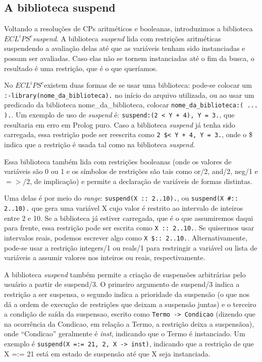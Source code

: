\documentclass{article}
\newcommand{\eclipse}{$ECL^iPS^e$}
\begin{document}
\subsection{A biblioteca suspend}

Voltando a resoluções de CPs aritméticos e booleanas, introduzimos a biblioteca \eclipse \textit{suspend}. A biblioteca \textit{suspend} lida com restrições aritméticas suspendendo a avaliação delas até que as variáveis tenham sido instanciadas e possam ser avaliadas. Caso elas não se tornem instanciadas até o fim da busca, o resultado é uma restrição, que é o que queríamos.

No \eclipse existem duas formas de se usar uma biblioteca: pode-se colocar um {\tt :-library(nome\_da\_biblioteca).} no início do arquivo utilizada, ou ao usar um predicado da biblioteca nome\_da\_biblioteca, colocar {\tt nome\_da\_biblioteca:( ... ).}. Um exemplo de uso de \textit{suspend} é: {\tt suspend:(2 < Y + 4), Y = 3.}, que resultaria em erro em Prolog puro. Caso a biblioteca \textit{suspend} já tenha sido carregada, essa restrição pode ser reescrita como {\tt 2 \$< Y + 4, Y = 3.},
onde o \$ indica que a restrição é usada tal como na biblioteca \textit{suspend}.

Essa biblioteca também lida com restrições booleanas (onde os valores de variáveis são 0 ou 1 e os símbolos de restrições são tais como or/2, and/2, neg/1 e $=>$/2, de implicação) e permite a declaração de variáveis de formas distintas.

Uma delas é por meio do \textit{range}: {\tt suspend(X :: 2..10).}, ou {\tt suspend(X \#:: 2..10).}  que gera uma variável X cujo valor é restrito ao intervalo de inteiros entre 2 e 10. Se a biblioteca já estiver carregada, que é o que assumiremos daqui para frente, essa restrição pode ser escrita como {\tt X :: 2..10.}. Se quisermos usar intervalos reais, podemos escrever algo como {\tt X \$:: 2..10.}.
Alternativamente, pode-se usar a restrição integers/1 ou reals/1 para restringir a variável ou lista de variáveis a assumir valores nos inteiros ou reais, respectivamente.



A biblioteca \textit{suspend} também permite a criação de suspensões arbitrárias pelo usuário a partir de suspend/3. O primeiro argumento de suspend/3 indica a restrição a ser suspensa, o segundo indica a prioridade da suspensão (o que nos dá a ordem de execução de restrições que deixam a suspensão juntas) e o terceiro a condição de saída da suspensao, escrito como {\tt Termo -> Condicao} (dizendo que na ocorrência da Condicao, em relação a Termo, a restrição deixa a suspensãoa), onde
``Condicao'' geralmente é \textit{inst}, indicando que o Termo é instanciado.
Um exemplo é {\tt suspend(X =:= 21, 2, X -> inst)}, indicando que a restrição de que X =:= 21 está em estado de suspensão até que X seja instanciada.
\end{document}
